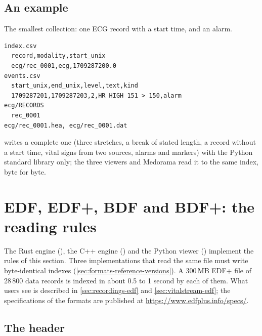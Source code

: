 \subsection{An example}
\label{sec:formats-reference-example}

The smallest collection: one ECG record with a start time, and an alarm.
\begin{lstlisting}[style=text]
index.csv
  record,modality,start_unix
  ecg/rec_0001,ecg,1709287200.0
events.csv
  start_unix,end_unix,level,text,kind
  1709287201,1709287203,2,HR HIGH 151 > 150,alarm
ecg/RECORDS
  rec_0001
ecg/rec_0001.hea, ecg/rec_0001.dat
\end{lstlisting}
 writes a complete one (three stretches, a break of
stated length, a record without a start time, vital signs from two sources, alarms and markers)
with the Python standard library only; the three viewers and Medorama read it to the same index,
byte for byte.

\section{EDF, EDF+, BDF and BDF+: the reading rules}
\label{sec:formats-reference-edf}

The Rust engine (), the C++ engine
() and the Python viewer
() implement the rules
of this section. Three implementations that read the same file must write byte-identical indexes
(\cref{sec:formats-reference-versions}). A 300\,MB EDF+ file of 28\,800 data records is indexed in
about 0.5 to 1 second by each of them. What users see is described in \cref{sec:recordings-edf}
and \cref{sec:vitalstream-edf}; the specifications of the formats are published at
\url{https://www.edfplus.info/specs/}.

\subsection{The header}
\label{sec:formats-reference-edf-header}

